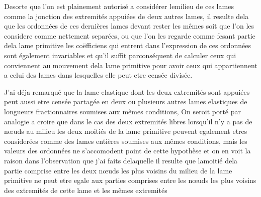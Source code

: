 \documentclass[11pt,a4paper]{article}
\begin{document}

Desorte que l'on est plainement autorisé a considérer lemilieu de
ces lames comme la jonction des extremités appuiées de deux autres
lames, il resulte dela que les ordonnées de ces dernières lames
devant rester les mêmes soit que l'on  les considere comme
nettement separées, ou que l'on les regarde comme fesant
partie dela lame primitive les coëfficiens qui entrent
dans l'expression de ces ordonnées sont également invariables
et qu'il suffit parconséquent de calculer ceux qui conviennent
au mouvement dela lame primitive pour avoir ceux
qui appartiennent a celui des lames dans lesquelles elle
peut etre censée divisée.

J'ai déja remarqué que la lame elastique dont les deux extremités
sont appuiées peut aussi etre censée partagée en deux ou plusieurs
autres lames elastiques de  longueurs fractionnaires soumises
aux mêmes conditions, On seroit porté par analogie a croire que
dans le cas des deux extremités libres lorsqu'il n'y a pas de nœuds
au milieu les deux moitiés de la lame primitive peuvent
egalement etres considerées comme des lames entières soumises aux
mêmes conditions, mais les valeurs des ordonnées ne s'accomodent point
de cette hypothèse et on en voit la raison dans l'observation
que j'ai faits delaquelle il resulte que lamoitié dela
partie comprise entre les deux nœuds les plus voisins du milieu de
la lame primitive ne peut etre egale aux parties comprises entre
les nœuds les plus voisins des extremités de cette lame et les mêmes
extremités

\end{document}
